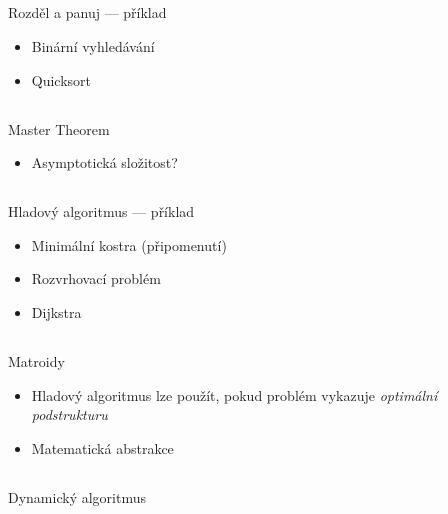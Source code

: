 \documentclass{beamer}
\begin{document}
\subsection{}
\begin{frame}{Rozděl a panuj --- příklad}
\begin{itemize}
\item Binární vyhledávání
\item Quicksort
\end{itemize}
\end{frame}

\subsection{}
\begin{frame}{Master Theorem}
\begin{itemize}
\item Asymptotická složitost?
\end{itemize}
\end{frame}

\subsection{}
\begin{frame}{Hladový algoritmus --- příklad}
\begin{itemize}
\item Minimální kostra (připomenutí)
\item Rozvrhovací problém
\item Dijkstra
\end{itemize}
\end{frame}

\subsection{}
\begin{frame}{Matroidy}
\begin{itemize}
\item Hladový algoritmus lze použít, pokud problém vykazuje {\em optimální podstrukturu}
\item Matematická abstrakce
\end{itemize}
\end{frame}

\subsection{}
\begin{frame}{Dynamický algoritmus}
\end{frame}
\end{document}
